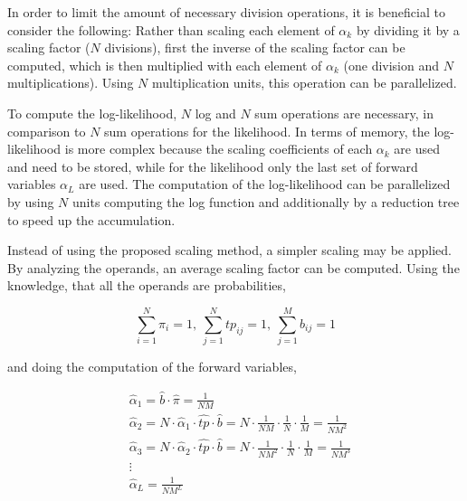 \documentclass[mscthesis]{usiinfthesis}
\begin{document}
In order to limit the amount of necessary division operations, it is beneficial
to consider the following: Rather than scaling each element of $\alpha_k$ by
dividing it by a scaling factor ($N$ divisions), first the inverse of the
scaling factor can be computed, which is then multiplied with each element of
$\alpha_k$ (one division and $N$ multiplications). Using $N$ multiplication
units, this operation can be parallelized.

To compute the log-likelihood, $N$ log and $N$ sum operations are necessary, in
comparison to $N$ sum operations for the likelihood. In terms of memory, the
log-likelihood is more complex because the scaling coefficients of each
$\alpha_k$ are used and need to be stored, while for the likelihood only the
last set of forward variables $\alpha_L$ are used. The computation of the
log-likelihood can be parallelized by using $N$ units computing the log
function and additionally by a reduction tree to speed up the accumulation.

Instead of using the proposed scaling method, a simpler scaling may be applied.
By analyzing the operands, an average scaling factor can be computed. Using the
knowledge, that all the operands are probabilities,

\begin{equation}
    \label{eq:scaling_sum}
    \sum\limits_{i=1}^{N} \pi_i = 1, \
    \sum\limits_{j=1}^{N} tp_{ij} = 1, \
    \sum\limits_{j=1}^{M} b_{ij} = 1
\end{equation}

and doing the computation of the forward variables,

\begin{equation}\begin{split}
    \label{eq:scaling_estimation}
    &\hat{\alpha}_1 = \hat{b} \cdot \hat{\pi} = \frac{1}{NM} \\
    &\hat{\alpha}_2 = N \cdot \hat{\alpha}_1 \cdot \hat{tp} \cdot \hat{b} =
        N \cdot \frac{1}{NM} \cdot \frac{1}{N} \cdot \frac{1}{M} =
        \frac{1}{NM^2} \\
    &\hat{\alpha}_3 = N \cdot \hat{\alpha}_2 \cdot \hat{tp} \cdot \hat{b} =
        N \cdot \frac{1}{NM^2} \cdot \frac{1}{N} \cdot \frac{1}{M} =
        \frac{1}{NM^3} \\
    &\vdots\\
    & \hat{\alpha}_L = \frac{1}{NM^L}
\end{split}\end{equation}
\end{document}
